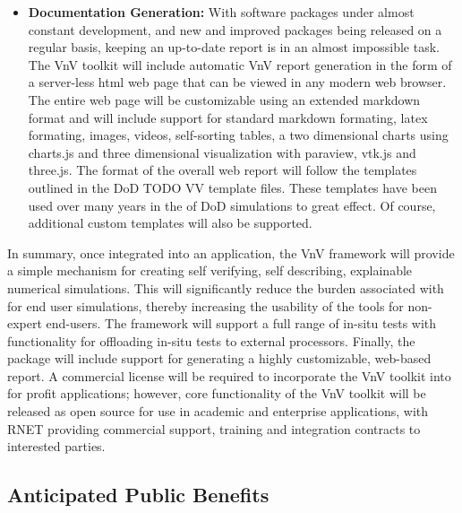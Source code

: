 \begin{itemize}
 \item{\bf Documentation Generation:} With software packages under almost constant development, and new and improved packages being released on a regular basis, keeping an up-to-date \VV report is in an almost impossible task. The VnV toolkit will include automatic VnV report generation in the form of a server-less html web page that can be viewed in any modern web browser. The entire web page will be customizable using an extended markdown format and will include support for standard markdown formating, latex formating, images, videos, self-sorting tables, a two dimensional charts using charts.js  and three dimensional visualization with paraview, vtk.js and three.js. The format of the overall web report will follow the templates outlined in the DoD TODO VV template files. These templates have been used over many years in the \VVA of DoD simulations to great effect. Of course, additional custom templates will also be supported. 
 \end{itemize}

In summary, once integrated into an application, the VnV framework will provide a simple mechanism for creating self verifying, self describing, explainable numerical simulations. This will significantly reduce the burden associated with \VV for end user simulations, thereby increasing the usability of the tools for non-expert end-users. The framework will support a full range of in-situ \VV tests with functionality for offloading in-situ tests to external processors. Finally, the package will include support for generating a highly customizable, web-based \VV report. A commercial license will be required to incorporate the VnV toolkit into for profit applications; however, core functionality of the VnV toolkit will be released as open source for use in academic and enterprise applications, with RNET providing commercial support, training and integration contracts to interested parties. 


\subsection{Anticipated Public Benefits}

